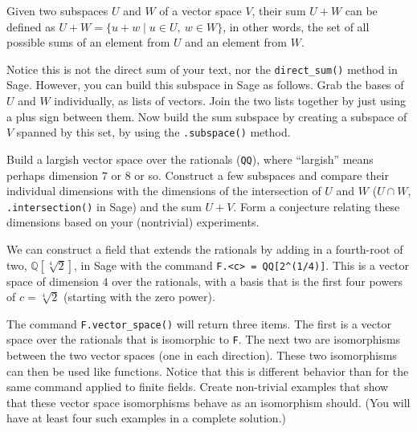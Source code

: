 \begin{sageverbatim}\end{sageverbatim}
%
%
Given two subspaces $U$ and $W$ of a vector space $V$, their sum $U+W$ can be defined as
$U+W=\{u+w\mid u\in U,\ w\in W\}$, in other words, the set of all possible sums of an element from $U$ and an element from $W$.\par
%
Notice this is not the direct sum of your text, nor the \verb?direct_sum()? method in Sage.  However, you can build this subspace in Sage as follows.  Grab the bases of $U$ and $W$ individually, as lists of vectors.  Join the two lists together by just using a plus sign between them.  Now build the sum subspace by creating a subspace of $V$ spanned by this set, by using the \verb?.subspace()? method.\par
%
Build a largish vector space over the rationals (\verb?QQ?), where ``largish'' means perhaps dimension $7$ or $8$ or so.  Construct a few subspaces and compare their individual dimensions with the dimensions of the intersection of $U$ and $W$ ($U\cap W$, \verb?.intersection()? in Sage) and the sum $U+V$.  Form a conjecture relating these dimensions based on your (nontrivial) experiments.
\begin{sageverbatim}\end{sageverbatim}
%
%
We can construct a field that extends the rationals by adding in a fourth-root of two, ${\mathbb Q}[\sqrt[4]{2}]$, in Sage with the command \verb?F.<c> = QQ[2^(1/4)]?.  This is a vector space of dimension 4 over the rationals, with a basis that is the first four powers of $c = \sqrt[4]{2}$ (starting with the zero power).\par
%
The command \verb?F.vector_space()? will return three items.  The first is a vector space over the rationals that is isomorphic to \verb?F?.  The next two are isomorphisms between the two vector spaces (one in each direction).  These two isomorphisms can then be used like functions.  Notice that this is different behavior than for the same command applied to finite fields.  Create non-trivial examples that show that these vector space isomorphisms behave as an isomorphism should.  (You will have at least four such examples in a complete solution.)
